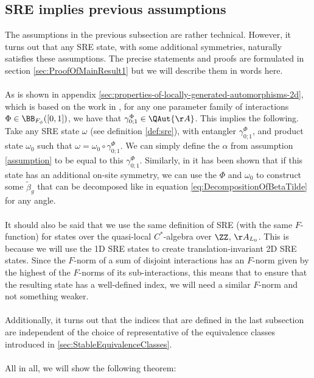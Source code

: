 \subsection{SRE implies previous assumptions}\label{sec:Results_1}
The assumptions in the previous subsection are rather technical. However, it turns out that any SRE state, with some additional symmetries, naturally satisfies these assumptions. The precise statements and proofs are formulated in section \ref{sec:ProofOfMainResult1} but we will describe them in words here.
\\\\
As is shown in appendix \ref{sec:properties-of-locally-generated-automorphisms-2d}, which is based on the work in \cite{Ogata2d}, for any one parameter family of interactions $\Phi\in\BB_{F_\phi}([0,1])$, we have that $\gamma^\Phi_{0;1}\in\QAut{\AA}$. This implies the following. Take any SRE state $\omega$ (see definition \ref{def:sre}), with entangler $\gamma^\Phi_{0;1}$, and product state $\omega_0$ such that $\omega=\omega_0\circ \gamma^\Phi_{0;1}$. We can simply define the $\alpha$ from assumption \ref{assumption} to be equal to this $\gamma^\Phi_{0;1}$. Similarly, in \cite{Ogata2d} it has been shown that if this state has an additional on-site symmetry, we can use the $\Phi$ and $\omega_0$ to construct some $\tilde\beta_g$ that can be decomposed like in equation \eqref{eq:DecompositionOfBetaTilde} for any angle.
\\\\
It should also be said that we use the same definition of SRE (with the same $F$-function) for states over the quasi-local $C^*$-algebra over $\ZZ$, $\AA_{L_0}$. This is because we will use the 1D SRE states to create translation-invariant 2D SRE states. Since the $F$-norm of a sum of disjoint interactions has an $F$-norm given by the highest of the $F$-norms of its sub-interactions, this means that to ensure that the resulting state has a well-defined index, we will need a similar $F$-norm and not something weaker.
\\\\
Additionally, it turns out that the indices that are defined in the last subsection are independent of the choice of representative of the equivalence classes introduced in \ref{sec:StableEquivalenceClasses}.
\\\\
All in all, we will show the following theorem:
